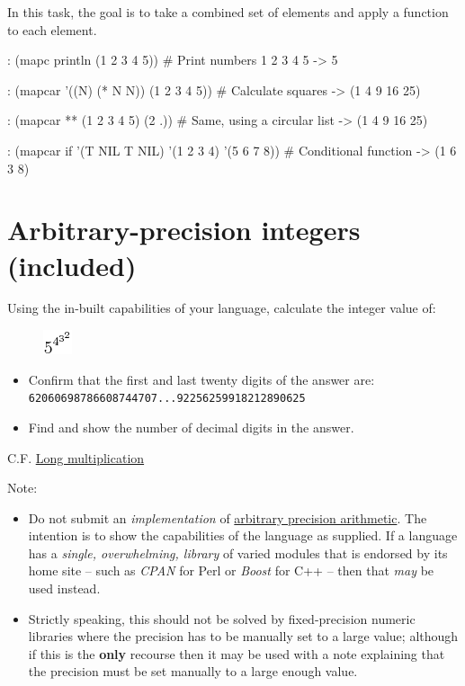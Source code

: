 In this task, the goal is to take a combined set of elements and apply a
function to each element.



\begin{wideverbatim}

: (mapc println (1 2 3 4 5))  # Print numbers
1
2
3
4
5
-> 5

: (mapcar '((N) (* N N)) (1 2 3 4 5))  # Calculate squares
-> (1 4 9 16 25)

: (mapcar ** (1 2 3 4 5) (2 .))  # Same, using a circular list
-> (1 4 9 16 25)

: (mapcar if '(T NIL T NIL) '(1 2 3 4) '(5 6 7 8))  # Conditional function
-> (1 6 3 8)

\end{wideverbatim}

\pagebreak{}
\section*{Arbitrary-precision integers (included)}


Using the in-built capabilities of your language, calculate the integer
value of:

\begin{figure}[H]
\centering
\includegraphics[scale=.9]{graphics/2869715b8204450d9946d9dd1966f50f.png}
\end{figure}

\begin{itemize}
\item
  Confirm that the first and last twenty digits of the answer are: \\
  \texttt{62060698786608744707...92256259918212890625}
\item
  Find and show the number of decimal digits in the answer.
\end{itemize}

C.F. \href{/wiki/Long\_multiplication}{Long multiplication}

Note:

\begin{itemize}
\item Do not submit an \emph{implementation} of
  \href{http://en.wikipedia.org/wiki/arbitrary\_precision\_arithmetic}{arbitrary
    precision arithmetic}. The intention is to show the capabilities
  of the language as supplied. If a language has a \emph{single,
    overwhelming, library} of varied modules that is endorsed by its
  home site -- such as \emph{CPAN} for Perl or \emph{Boost} for C++ --
  then that \emph{may} be used instead.
\item
  Strictly speaking, this should not be solved by fixed-precision
  numeric libraries where the precision has to be manually set to a
  large value; although if this is the \textbf{only} recourse then it
  may be used with a note explaining that the precision must be set
  manually to a large enough value.
\end{itemize}

